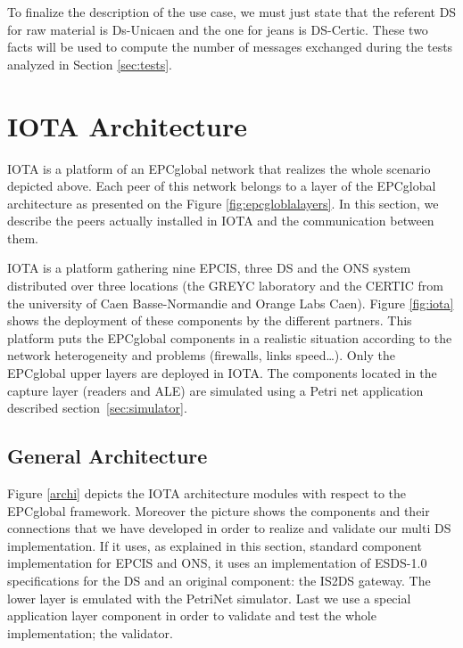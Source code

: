 \documentclass[a4paper]{llncs}
\begin{document}

To finalize the description of the use case, we must just state that the
referent DS for raw material is Ds-Unicaen and the one for jeans is
DS-Certic. These two facts will be used to compute the number of
messages exchanged during the tests analyzed in  Section \ref{sec:tests}.

\section{IOTA Architecture}

IOTA is a platform of an EPCglobal
network that realizes the whole scenario depicted above. Each peer of this
network belongs to a layer of the EPCglobal architecture as presented on the
Figure \ref{fig:epcgloblalayers}. In this section, we describe the peers
actually installed in IOTA and the communication between them.

IOTA is a platform gathering nine EPCIS, three DS and the ONS system
distributed over three locations (the GREYC laboratory and the CERTIC from the
university of Caen Basse-Norman\-die and Orange Labs Caen). Figure
\ref{fig:iota} shows the deployment of these components by the different
partners. This platform puts the EPCglobal components in a realistic situation
according to the network heterogeneity and problems (firewalls, links
speed\ldots{}). Only the EPCglobal upper layers are deployed in IOTA. The
components located in the capture layer (readers and ALE) are simulated using a
Petri net application described section~\ref{sec:simulator}.

\subsection{General Architecture}

Figure \ref{archi} depicts the IOTA architecture modules with respect to
the EPCglobal framework. Moreover the picture shows the components and their
connections that we have developed in order to realize and validate our multi
DS implementation. If it uses, as explained in this section, standard component
implementation for EPCIS and ONS, it uses an implementation of ESDS-1.0
specifications for the DS and an original component: the IS2DS gateway. The
lower layer is emulated with the PetriNet simulator. Last we use a special
application layer component in order to validate and test the whole
implementation; the validator.
\end{document}
